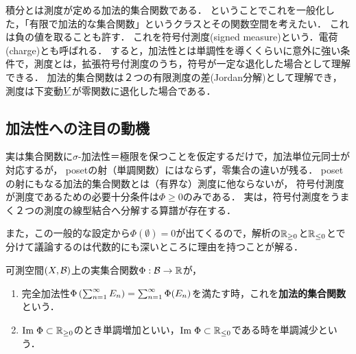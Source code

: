 \documentclass[uplatex, dvipdfmx]{jsreport}
\begin{document}
\begin{tcolorbox}[colframe=ForestGreen, colback=ForestGreen!10!white,breakable,colbacktitle=ForestGreen!40!white,coltitle=black,fonttitle=\bfseries\sffamily,
title=加法的集合関数という概念：表現可能関手！？]
    積分とは測度が定める加法的集合関数である．
    ということでこれを一般化した，「有限で加法的な集合関数」というクラスとその関数空間を考えたい．
    これは負の値を取ることも許す．
    これを符号付測度(signed measure)という．電荷(charge)とも呼ばれる．
    すると，加法性とは単調性を導くくらいに意外に強い条件で，測度とは，拡張符号付測度のうち，符号が一定な退化した場合として理解できる．
    加法的集合関数は２つの有限測度の差(Jordan分解)として理解でき，測度は下変動$\underline{V}$が零関数に退化した場合である．
\end{tcolorbox}

\subsection{加法性への注目の動機}

\begin{tcolorbox}[colframe=ForestGreen, colback=ForestGreen!10!white,breakable,colbacktitle=ForestGreen!40!white,coltitle=black,fonttitle=\bfseries\sffamily,
title=]
    実は集合関数に$\sigma$-加法性＝極限を保つことを仮定するだけで，加法単位元同士が対応するが，
    posetの射（単調関数）にはならず，零集合の違いが残る．
    posetの射にもなる加法的集合関数とは（有界な）測度に他ならないが，
    符号付測度が測度であるための必要十分条件は$\Phi\ge 0$のみである．
    実は，符号付測度をうまく２つの測度の線型結合へ分解する算譜が存在する．

    また，この一般的な設定から$\Phi(\emptyset)=0$が出てくるので，解析の$\mathbb{R}_{\ge 0}$と$\mathbb{R}_{\le 0}$とで分けて議論するのは代数的にも深いところに理由を持つことが解る．
\end{tcolorbox}

\begin{definition}
    可測空間$(X,\mathcal{B})$上の実集合関数$\Phi:\mathcal{B}\to\mathbb{R}$が，
    \begin{enumerate}
        \item 完全加法性$\Phi\left(\sum^\infty_{n=1}E_n\right)=\sum^\infty_{n=1}\Phi(E_n)$を満たす時，これを\textbf{加法的集合関数}という．
        \item $\mathrm{Im}\;\Phi\subset\mathbb{R}_{\ge 0}$のとき単調増加といい，$\mathrm{Im}\;\Phi\subset\mathbb{R}_{\le 0}$である時を単調減少という．
    \end{enumerate}
\end{definition}
\end{document}
